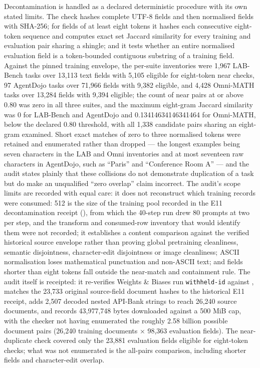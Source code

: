 \documentclass[12pt,a4paper]{report}
\DeclareRobustCommand{\longtok}[1]{\texttt{\seqsplit{#1}}}
\begin{document}
Decontamination is handled as a declared deterministic procedure with
its own stated limits. The check hashes complete UTF-8 fields and then
normalised fields with SHA-256; for fields of at least eight tokens it
hashes each consecutive eight-token sequence and computes exact set
Jaccard similarity for every training and evaluation pair sharing a
shingle; and it tests whether an entire normalised evaluation field is a
token-bounded contiguous substring of a training field. Against the
pinned training envelope, the per-suite inventories were 1,967 LAB-Bench
tasks over 13,113 text fields with 5,105 eligible for eight-token near
checks, 97 AgentDojo tasks over 71,966 fields with 9,382 eligible, and
4,428 Omni-MATH tasks over 13,284 fields with 9,394 eligible; the count
of near pairs at or above 0.80 was zero in all three suites, and the
maximum eight-gram Jaccard similarity was 0 for LAB-Bench and AgentDojo
and 0.13414634146341464 for Omni-MATH, below the declared 0.80
threshold, with all 1,338 candidate pairs sharing an eight-gram
examined. Short exact matches of zero to three normalised tokens were
retained and enumerated rather than dropped --- the longest examples
being seven characters in the LAB and Omni inventories and at most
seventeen raw characters in AgentDojo, such as ``Paris'' and
``Conference Room A'' --- and the audit states plainly that these
collisions do not demonstrate duplication of a task but do make an
unqualified ``zero overlap'' claim incorrect. The audit's scope limits
are recorded with equal care: it does not reconstruct which training
records were consumed: 512 is the size of the training pool recorded in
the E11 decontamination receipt
(\longtok{selected\_\allowbreak{}training\_\allowbreak{}row\_\allowbreak{}count}), from which the 40-step run
drew 80 prompts at two per step, and the transform and consumed-row
inventory that would identify them were not recorded; it establishes a
content comparison against the verified historical source envelope
rather than proving global pretraining cleanliness, semantic
disjointness, character-edit disjointness or image cleanliness; ASCII
normalisation loses mathematical punctuation and non-ASCII text; and
fields shorter than eight tokens fall outside the near-match and
containment rule. The audit itself is receipted: it re-verifies Weights
\& Biases run \texttt{withheld-id} against
\longtok{training\_\allowbreak{}identity\_\allowbreak{}verified.json}, matches the 23,733 original
source-field document hashes to the historical E11 receipt, adds 2,507
decoded nested API-Bank strings to reach 26,240 source documents, and
records 43,977,748 bytes downloaded against a 500 MiB cap, with the
checker not having enumerated the roughly 2.58 billion possible document
pairs (26,240 training documents × 98,363 evaluation fields). The
near-duplicate check covered only the 23,881 evaluation fields eligible
for eight-token checks; what was not enumerated is the all-pairs
comparison, including shorter fields and character-edit overlap.
\end{document}

